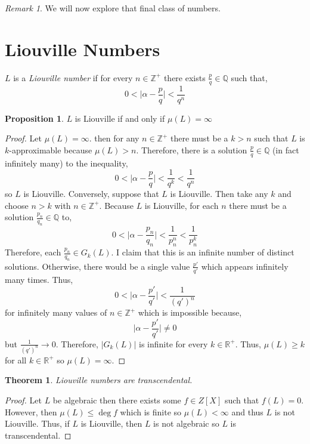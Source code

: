 \documentclass{article}
\newcommand{\Zplus}{\mathbb{Z}^{+}}
\newcommand{\Q}{\mathbb{Q}}
\newcommand{\Rplus}{\mathbb{R}^+}
\newenvironment{definition}[1][Definition:]{\begin{trivlist}
\item[\hskip \labelsep {\bfseries #1}]}{\end{trivlist}}
\theoremstyle{theorem}
\newtheorem{theorem}{Theorem}[section]
\theoremstyle{definition}
\theoremstyle{definition}
\newtheorem*{proposition}{Proposition}
\theoremstyle{remark}
\theoremstyle{definition}
\theoremstyle{remark}
\newtheorem{remark}{Remark}[subsection]
\begin{document}
\begin{remark}
We will now explore that final class of numbers. 
\end{remark}

\section{Liouville Numbers} 

\begin{definition}
$L$ is a \textit{Liouville number} if for every $n \in \Zplus$ there exists $\frac{p}{q}  \in \Q$ such that,
\[ 0 < \Big| \alpha - \frac{p}{q} \Big| < \frac{1}{q^n} \]
\end{definition}

\begin{proposition}
$L$ is Liouville if and only if $\mu(L) = \infty$
\end{proposition}

\begin{proof}
Let $\mu(L) = \infty$. then for any $n \in \Zplus$ there must be a $k > n$ such that $L$ is $k$-approximable because $\mu(L) > n$. Therefore, there is a solution $\frac{p}{q} \in \Q$ (in fact infinitely many) to the inequality,
\[0 < \Big| \alpha - \frac{p}{q} \Big| < \frac{1}{q^k} < \frac{1}{q^n}\] 
so $L$ is Liouville. Conversely, suppose that $L$ is Liouville. Then take any $k$ and choose $n > k$ with $n \in \Zplus$. Because $L$ is Liouville, for each $n$ there must be a solution $\frac{p_n}{q_n} \in \Q$ to,
\[0 < \Big| \alpha - \frac{p_n}{q_n} \Big| < \frac{1}{p_n^n} < \frac{1}{p_n^k}\]
Therefore, each $\frac{p_n}{q_n} \in G_k(L)$. I claim that this is an infinite number of distinct solutions. Otherwise, there would be a single value $\frac{p'}{q'}$ which appears infinitely many times. Thus,  
\[0 < \Big| \alpha - \frac{p'}{q'} \Big| < \frac{1}{(q')^n}\]
for infinitely many values of $n \in \Zplus$ which is impossible because,
\[\Big| \alpha - \frac{p'}{q'} \Big| \neq 0\]
but $\frac{1}{(q')^n} \to 0$. Therefore, $|G_k(L)|$ is infinite for every $k \in \Rplus$. Thus, $\mu(L) \ge k$ for all $k \in \Rplus$ so $\mu(L) = \infty$.
\end{proof}

\begin{theorem}
Liouville numbers are transcendental. 
\end{theorem}

\begin{proof}
Let $L$ be algebraic then there exists some $f \in Z[X]$ such that $f(L) = 0$. However, then $\mu(L) \le \deg{f}$ which is finite so $\mu(L) < \infty$ and thus $L$ is not Liouville. Thus, if $L$ is Liouville, then $L$ is not algebraic so $L$ is transcendental.
\end{proof}
\end{document}
